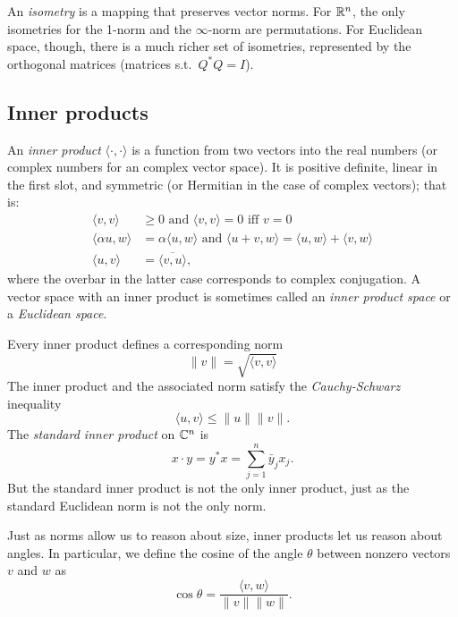 \documentclass[12pt, leqno]{article} %
\begin{document}
An {\em isometry} is a mapping that preserves vector norms.
For $\mathbb{R}^n$, the only isometries for the 1-norm and the $\infty$-norm
are permutations.  For Euclidean space, though, there is a much
richer set of isometries, represented by the orthogonal matrices
(matrices s.t.~$Q^* Q = I$).


\subsection{Inner products}

An {\em inner product} $\langle \cdot, \cdot \rangle$
is a function from two vectors into the real
numbers (or complex numbers for an complex vector space).  It is
positive definite, linear in the first slot, and symmetric (or
Hermitian in the case of complex vectors); that is:
\begin{align*}
  \langle v, v \rangle & \geq 0 \mbox{ and }
  \langle v, v \rangle = 0 \mbox{ iff } v = 0 \\
%
  \langle \alpha u, w \rangle &= \alpha \langle u, w \rangle
  \mbox{ and }
  \langle u+v, w \rangle = \langle u, w \rangle + \langle v, w \rangle \\
%
  \langle u, v \rangle &= \overline{\langle v, u \rangle},
\end{align*}
where the overbar in the latter case corresponds to complex
conjugation.  A vector space with an inner product is sometimes
called an {\em inner product space} or a {\em Euclidean space}.

Every inner product defines a corresponding norm
\[
  \|v\| = \sqrt{ \langle v, v \rangle}
\]
The inner product and the associated norm satisfy
the {\em Cauchy-Schwarz} inequality
\[
  \langle u, v \rangle \leq \|u\| \|v\|.
\]
The {\em standard inner product} on $\mathbb{C}^n$ is
\[
  x \cdot y = y^* x = \sum_{j=1}^n \bar{y}_j x_j.
\]
But the standard inner product is not the only inner product,
just as the standard Euclidean norm is not the only norm.

Just as norms allow us to reason about size, inner products let us
reason about angles.  In particular, we define the cosine of
the angle $\theta$ between nonzero vectors $v$ and $w$ as
\[
  \cos \theta = \frac{\langle v, w \rangle}{\|v\| \|w\|}.
\]
\end{document}
